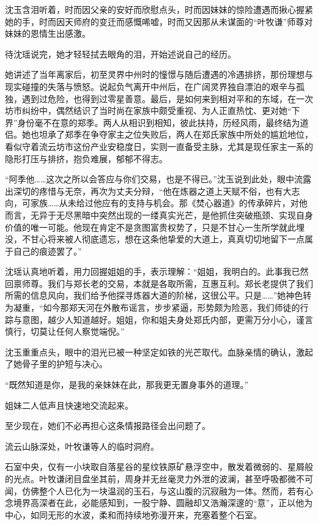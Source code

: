 沈玉含泪听着，时而因父亲的安好而欣慰点头，时而因妹妹的惊险遭遇而揪心握紧她的手，时而因天师府的变迁而感慨唏嘘，时而又因那从未谋面的“叶牧谦”师尊对妹妹的恩情生出感激。

待沈瑶说完，她才轻轻拭去眼角的泪，开始述说自己的经历。

她讲述了当年离家后，初至灵界中州时的憧憬与随后遭遇的冷遇排挤，那份理想与现实碰撞的失落与愤怒。说起负气离开中州后，在广阔灵界独自漂泊的艰辛与孤独，遇到过危险，也得到过零星善意。最后，是如何来到相对平和的东域，在一次坊市纠纷中，偶然结识了当时尚在家族中颇受重视、为人正直热忱、更对她“下界”身份毫不在意的郑季。两人从相识到相知，彼此扶持，历经风雨，最终结为道侣。她也坦承了郑季在争夺家主之位失败后，两人在郑氏家族中所处的尴尬地位，看似守着流云坊市这份产业安稳度日，实则一直备受主脉，尤其是现任家主一系的隐形打压与排挤，抱负难展，郁郁不得志。

“阿季他……这次之所以会答应与你们交易，也是不得已。”沈玉说到此处，眼中流露出深切的疼惜与无奈，再次为丈夫分辩，“他在炼器之道上天赋不俗，也有大志向，可家族……从未给过他应有的支持与机会。那《焚心器道》的传承碎片，对他而言，无异于无尽黑暗中突然出现的一缕真实光芒，是他抓住突破瓶颈、实现自身价值的唯一可能。他现在肯定不是贪图富贵权势了，只是不甘心一生所学就此埋没，不甘心将来被人彻底遗忘，想在这条他挚爱的大道上，真真切切地留下一点属于自己的痕迹罢了。”

沈瑶认真地听着，用力回握姐姐的手，表示理解：“姐姐，我明白的。此事我已然回禀师尊。我们与郑长老的交易，本就是各取所需，互惠互利。郑长老提供了我们所需的信息风向，我们给予他探寻炼器大道的阶梯，这很公平。只是……”她神色转为凝重，“如今那郑天河在外散布谣言，步步紧逼，形势颇为险恶，我们师徒的行踪与意图，越少人知道越好。姐姐，你和姐夫身处郑氏内部，更需万分小心，谨言慎行，切莫让任何人察觉端倪。”

沈玉重重点头，眼中的泪光已被一种坚定如铁的光芒取代。血脉亲情的确认，激起了她骨子里的护短与决心。

“既然知道是你，是我的亲妹妹在此，那我更无置身事外的道理。”

姐妹二人低声且快速地交流起来。

至少现在，她们不必再担心这条情报路径会出问题了。

\vspace{2em}

流云山脉深处，叶牧谦等人的临时洞府。

石室中央，仅有一小块取自落星谷的星纹铁原矿悬浮空中，散发着微弱的、星屑般的光点。叶牧谦闭目盘坐其前，周身并无丝毫灵力外泄的波澜，甚至呼吸都微不可闻，仿佛整个人已化为一块温润的玉石，与这山腹的沉寂融为一体。然而，若有心念境界高深者在此，必能感知到，一股宁静、圆融却又浩瀚深邃的“意”，正以他为中心，如同无形的水波，柔和而持续地弥漫开来，充塞着整个石室。

